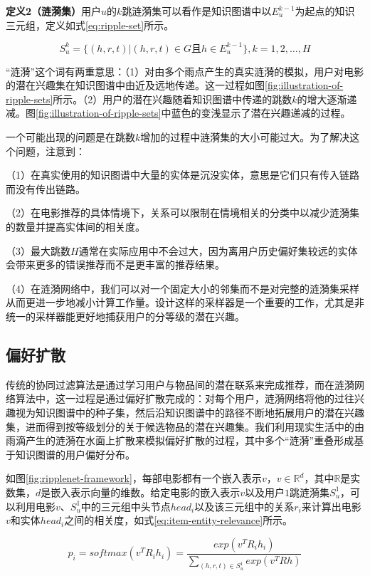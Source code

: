 \documentclass{bjfuthesis}
\begin{document}
\textbf{定义2（涟漪集）}用户$u$的$k$跳涟漪集可以看作是知识图谱中以$E^{k-1}_u$为起点的知识三元组，定义如式\eqref{eq:ripple-set}所示。

\begin{equation}
	S_u^k = \{(h, r, t)|(h, r, t)\in G \text{且} h\in E^{k-1}_u\}, k = 1, 2, \dots, H\label{eq:ripple-set}
\end{equation}

“涟漪”这个词有两重意思：（1）对由多个雨点产生的真实涟漪的模拟，用户对电影的潜在兴趣集在知识图谱中由近及远地传递。这一过程如图\ref{fig:illustration-of-ripple-sets}所示。（2）用户的潜在兴趣随着知识图谱中传递的跳数$k$的增大逐渐递减。图\ref{fig:illustration-of-ripple-sets}中蓝色的变浅显示了潜在兴趣递减的过程。

一个可能出现的问题是在跳数$k$增加的过程中涟漪集的大小可能过大。为了解决这个问题，注意到：

（1）在真实使用的知识图谱中大量的实体是沉没实体，意思是它们只有传入链路而没有传出链路。

（2）在电影推荐的具体情境下，关系可以限制在情境相关的分类中以减少涟漪集的数量并提高实体间的相关度。

（3）最大跳数$H$通常在实际应用中不会过大，因为离用户历史偏好集较远的实体会带来更多的错误推荐而不是更丰富的推荐结果。

（4）在涟漪网络中，我们可以对一个固定大小的邻集而不是对完整的涟漪集采样从而更进一步地减小计算工作量。设计这样的采样器是一个重要的工作，尤其是非统一的采样器能更好地捕获用户的分等级的潜在兴趣。
\subsection{偏好扩散}
\label{sec:osum}
传统的协同过滤算法是通过学习用户与物品间的潜在联系来完成推荐，而在涟漪网络算法中，这一过程是通过偏好扩散完成的：对每个用户，涟漪网络将他的过往兴趣视为知识图谱中的种子集，然后沿知识图谱中的路径不断地拓展用户的潜在兴趣集，进而得到按等级划分的关于候选物品的潜在兴趣集。我们利用现实生活中的由雨滴产生的涟漪在水面上扩散来模拟偏好扩散的过程，其中多个“涟漪”重叠形成基于知识图谱的用户偏好分布。

如图\ref{fig:ripplenet-framework}，每部电影都有一个嵌入表示$v$，$v\in \mathbb{R}^{d}$，其中$\mathbb{R}$是实数集，$d$是嵌入表示向量的维数。给定电影的嵌入表示$v$以及用户$1$跳涟漪集$S_u^{1}$，可以利用电影$v$、$S_u^{1}$中的三元组中头节点$head_i$以及该三元组中的关系$r_i$来计算出电影$v$和实体$head_i$之间的相关度，如式\eqref{eq:item-entity-relevance}所示。

\begin{equation}
	p_i=softmax(v^TR_ih_i)=\frac{exp(v^TR_ih_i)}{\sum_{(h, r, t)\in S_u^1} exp(v^TRh)}\label{eq:item-entity-relevance}
\end{equation}
\end{document}
